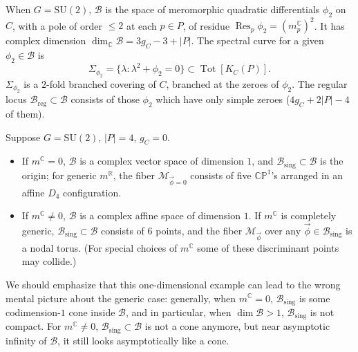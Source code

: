 \documentclass[12pt,letterpaper,reqno]{article}
\numberwithin{equation}{section}
\newcommand{\cB}{\ensuremath{\mathcal B}}
\newcommand{\cM}{\ensuremath{\mathcal M}}
\newcommand{\R}{\ensuremath{\mathbb R}}
\newcommand{\C}{\ensuremath{\mathbb C}}
\newcommand{\bbP}{\ensuremath{\mathbb P}}
\newcommand{\sing}{\mathrm{sing}}
\newcommand{\reg}{\mathrm{reg}}
\newcommand{\abs}[1]{\lvert#1\rvert}
\newcommand{\vphi}{{\vec\phi}}
\DeclareMathOperator{\Res}{Res}
\DeclareMathOperator{\Tot}{Tot}
\newcommand{\SU}{\mathrm{SU}}
\newcommand{\insfig}[2]{

\medskip
\noindent
\begin{minipage}{\linewidth}

\makebox[\linewidth]{\texttt{[image: figures/\#1-crop.pdf]}}

\end{minipage}
\medskip

}
\newcommand{\fixme}[1]{{\color{orange}{[#1]}}}
\begin{document}
\begin{example}[Hitchin base and spectral curves for $G = \SU(2)$]
When $G = \SU(2)$, $\cB$ is the space of meromorphic quadratic
differentials $\phi_2$ on $C$, with a pole of order $\le 2$ at 
each $p \in P$, of residue $\Res_p \phi_2 = (m_p^\C)^2$.
It has complex dimension
$\dim_\C \cB = 3 g_C - 3 + \abs{P}$. 
The spectral curve for a given $\phi_2 \in \cB$
is
\begin{equation}
  \Sigma_{\phi_2} = \{\lambda: \lambda^2 + \phi_2 = 0\} \subset \Tot[K_C(P)].
\end{equation}
$\Sigma_{\phi_2}$ is a $2$-fold branched covering of $C$, branched at the zeroes of $\phi_2$.
The regular locus $\cB_\reg \subset \cB$ consists of those $\phi_2$ which have only simple zeroes ($4 g_C + 2\abs{P} - 4$ of them).
\end{example}


\begin{example}
Suppose $G = \SU(2)$, $\abs{P} = 4$, $g_C = 0$.
\begin{itemize}
  \item
If $m^\C = 0$, $\cB$ is a complex vector space of dimension $1$,
and $\cB_\sing \subset \cB$ is the origin;
for generic $m^\R$,
the fiber $\cM_{\vphi =0}$ consists of five $\C \bbP^1$'s
arranged in an affine $D_4$ configuration.

\item If $m^\C \neq 0$, $\cB$ is a complex affine space of dimension $1$.
If $m^\C$ is completely generic, $\cB_\sing \subset \cB$ consists
of $6$ points, and the fiber $\cM_\vphi$ over any $\vphi \in \cB_\sing$ is
a nodal torus. (For special choices of $m^\C$ some of these discriminant points 
may collide.)
\end{itemize}
\end{example}

\insfig{higgs-metric-2}{0.85}

\fixme{also do the 3-punctured $SU(3)$ case?}

We should emphasize that this one-dimensional example can lead to the
wrong mental picture about the generic case: generally,
when $m^\C = 0$, $\cB_\sing$ is some codimension-$1$ cone inside $\cB$, and in particular,
when $\dim \cB > 1$, $\cB_\sing$ is not compact. For $m^\C \neq 0$, $\cB_\sing \subset \cB$
is not a cone anymore, but near asymptotic infinity of $\cB$,
it still looks asymptotically like a cone.
\end{document}
